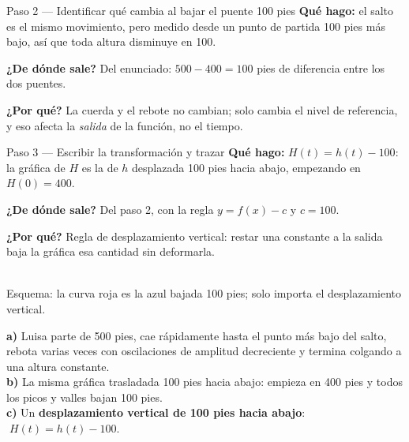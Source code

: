 \documentclass[11pt]{article}
\begin{document}
\begin{paso}{Paso 2 --- Identificar qué cambia al bajar el puente 100 pies}
\textbf{Qué hago:} el salto es el mismo movimiento, pero medido desde un punto de partida 100 pies más bajo, así que toda altura disminuye en 100.

\textbf{¿De dónde sale?} Del enunciado: $500-400=100$ pies de diferencia entre los dos puentes.

\textbf{¿Por qué?} La cuerda y el rebote no cambian; solo cambia el nivel de referencia, y eso afecta la \emph{salida} de la función, no el tiempo.
\end{paso}

\begin{paso}{Paso 3 --- Escribir la transformación y trazar}
\textbf{Qué hago:} $H(t)=h(t)-100$: la gráfica de $H$ es la de $h$ desplazada 100 pies hacia abajo, empezando en $H(0)=400$.

\textbf{¿De dónde sale?} Del paso 2, con la regla $y=f(x)-c$ y $c=100$.

\textbf{¿Por qué?} Regla de desplazamiento vertical: restar una constante a la salida baja la gráfica esa cantidad sin deformarla.

\begin{center}
\\
{\small Esquema: la curva roja es la azul bajada 100 pies; solo importa el desplazamiento vertical.}
\end{center}
\end{paso}

\begin{resp}
\textbf{a)} Luisa parte de 500 pies, cae rápidamente hasta el punto más bajo del salto, rebota varias veces con oscilaciones de amplitud decreciente y termina colgando a una altura constante.\\
\textbf{b)} La misma gráfica trasladada 100 pies hacia abajo: empieza en 400 pies y todos los picos y valles bajan 100 pies.\\
\textbf{c)} Un \textbf{desplazamiento vertical de 100 pies hacia abajo}: $\;H(t)=h(t)-100$.
\end{resp}
\end{document}
